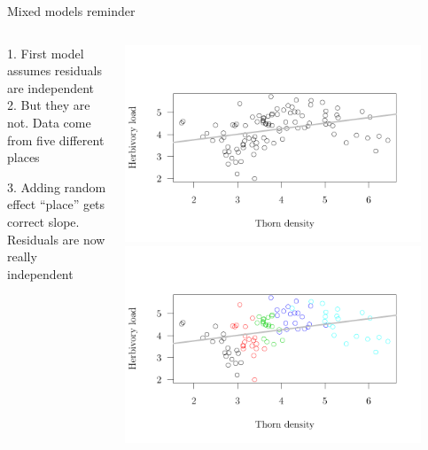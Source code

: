 \documentclass{beamer}
\begin{document}
\begin{frame}{Mixed models reminder}
\vspace{-1cm}
\begin{columns}
    \begin{column}{0.5\textwidth}
     1. First model assumes residuals are independent\\
     \vspace{1cm}
     2. But they are not. Data come from five different places\\
     \vspace{1cm}
     
     3. Adding random effect ``place'' gets correct slope. Residuals are now really independent
    \end{column}

    \begin{column}{0.5\textwidth}
     \includegraphics[width=0.9\textwidth]{figure/graph0-1}\vspace{-1cm}
     \includegraphics[width=0.9\textwidth]{figure/graph1-1}\vspace{-1cm}

\end{column}
\end{columns}
\end{frame}
\end{document}
